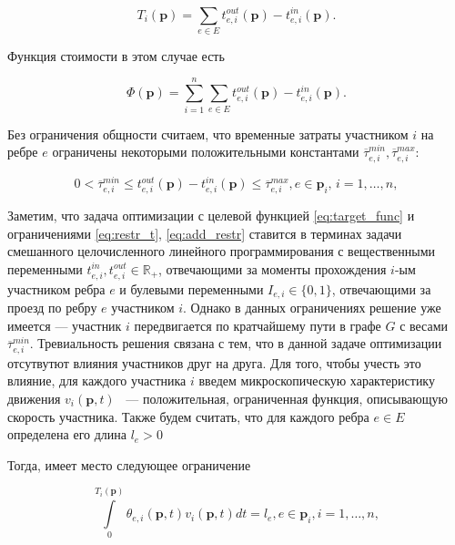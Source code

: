 \documentclass[12pt, a4paper]{article}
\begin{document}
\begin{equation}
	\label{eq:T_i_by_t}
	T_i(\textbf{p}) = \sum \limits_{e \in E} t_{e, i}^{out}(\textbf{p}) - t_{e, i}^{in}(\textbf{p}).
\end{equation}

Функция стоимости в этом случае есть 

\begin{equation}
	\label{eq:target_func}
	\Phi(\textbf{p}) =\sum \limits_{i = 1}^n \sum \limits_{e \in E} t_{e, i}^{out}(\textbf{p}) - t_{e, i}^{in}(\textbf{p}).
\end{equation}

Без ограничения общности считаем, что временные затраты участником $i$ на ребре $e$ ограничены некоторыми положительными константами $\overline{\tau}_{e, i}^{min}, \overline{\tau}_{e, i}^{max}$:

\begin{equation}
	\label{eq:add_restr}
		0 < \overline{\tau}_{e, i}^{min} \le t_{e, i}^{out}(\textbf{p}) - t_{e, i}^{in}(\textbf{p}) \le \overline{\tau}_{e, i}^{max}, e \in \textbf{p}_i,\, i = 1, \dots, n,
\end{equation}

Заметим, что задача оптимизации с целевой функцией \eqref{eq:target_func} и ограничениями \eqref{eq:restr_t}, \eqref{eq:add_restr} ставится в терминах задачи смешанного целочисленного линейного программирования с вещественными переменными $t_{e, i}^{in}, t_{e, i}^{out} \in \mathbb{R}_+$, отвечающими за моменты прохождения $i$-ым участником ребра $e$ и булевыми переменными $I_{e, i} \in \{0, 1\}$, отвечающими за проезд по ребру $e$ участником $i$. Однако в данных ограничениях решение уже имеется --- участник $i$ передвигается по кратчайшему пути в графе $G$ с весами $\overline{\tau}_{e, i}^{min}$. Тревиальность решения связана с тем, что в данной задаче оптимизации отсутвутют влияния участников друг на друга. Для того, чтобы учесть это влияние, для каждого участника $i$ введем микроскопическую характеристику движения $v_i(\textbf{p}, t)$ ~--- положительная, ограниченная функция, описывающую скорость участника. Также будем считать, что для каждого ребра $e \in E$ определена его длина $l_e > 0$

Тогда, имеет место следующее ограничение

\begin{equation}
	\label{eq:velocity_eq_by_theta}
	\int\limits_{0}^{T_i(\textbf{p})} \theta_{e, i} (\textbf{p}, t) v_i(\textbf{p}, t) dt = l_e, e \in \textbf{p}_i, i = 1, \dots, n,
\end{equation}
\end{document}
